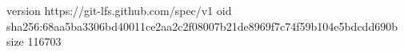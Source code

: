 version https://git-lfs.github.com/spec/v1
oid sha256:68aa5ba3306bd40011ce2aa2c2f08007b21de8969f7c74f59b104e5bdcdd690b
size 116703
